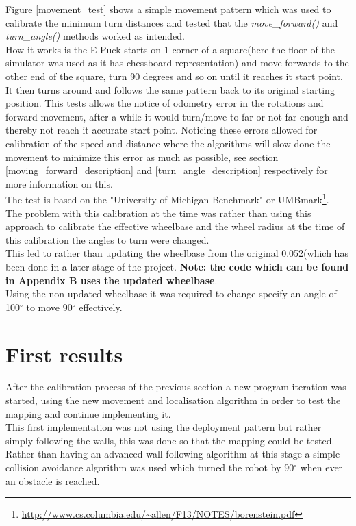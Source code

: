 \begin{flushleft}
Figure \ref{movement_test} shows a simple movement pattern which was used to calibrate the minimum turn distances and tested that the \textit{move\_forward()} and \textit{turn\_angle()} methods worked as intended. \\
How it works is the E-Puck starts on 1 corner of a square(here the floor of the simulator was used as it has chessboard representation) and move forwards to the other end of the square, turn 90 degrees and so on until it reaches it start point. It then turns around and follows the same pattern back to its original starting position. This tests allows the notice of odometry error in the rotations and forward movement, after a while it would turn/move to far or not far enough and thereby not reach it accurate start point. Noticing these errors allowed for calibration of the speed and distance where the algorithms will slow done the movement to minimize this error as much as possible, see section \ref{moving_forward_description} and \ref{turn_angle_description} respectively for more information on this.\\[3ex]
The test is based on the "University of Michigan Benchmark" or UMBmark\footnote{\url{http://www.cs.columbia.edu/~allen/F13/NOTES/borenstein.pdf}}.\\[3ex]

The problem with this calibration at the time was rather than using this approach to calibrate the effective wheelbase and the wheel radius at the time of this calibration the angles to turn were changed.\\
This led to rather than updating the wheelbase from  the original 0.052(which has been done in a later stage of the project. \textbf{Note: the code which can be found in Appendix B uses the updated wheelbase}.\\
Using the non-updated wheelbase it was required to change specify an angle of 100$^{\circ}$ to move 90$^{\circ}$ effectively.

\section{First results}
After the calibration process of the previous section a new program iteration was started, using the new movement and localisation algorithm in order to test the mapping and continue implementing it. \\[3ex]

This first implementation was not using the deployment pattern but rather simply following the walls, this was done so that the mapping could be tested. Rather than having an advanced wall following algorithm at this stage a simple collision avoidance algorithm was used which turned the robot by 90$^\circ$ when ever an obstacle is reached. 


\end{flushleft}
